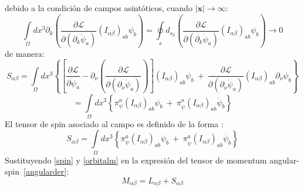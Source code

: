 \documentclass[a4paper,12pt]{article}
\begin{document}
debido a la condición de campos asintóticos, cuando $|\textbf{x}|\rightarrow\infty$:
\begin{equation}
\int\limits_{\Omega}dx^{3}\partial_k\left(\frac{\partial\mathscr{L} }{\partial(\partial_{k}\dot \psi_a)}(I_{\alpha\beta})_{ab}\psi_b\right)=\oint\limits_{s}d_{s_k}\left(\frac{\partial\mathscr{L} }{\partial(\partial_{k}\dot \psi_a)}(I_{\alpha\beta})_{ab}\psi_b\right)\rightarrow0 
\end{equation}
de manera:
$$
S_{\alpha\beta}=\int\limits_{\Omega}dx^{3}\left\{ \left[\frac{\partial \mathscr{L} }{\partial\dot \psi_a}-\partial_{\nu}\left(\frac{\partial\mathscr{L} }{\partial(\partial_{\nu}\dot \psi_a)}  \right) \right](I_{\alpha\beta})_{ab}\psi_{b}\ +\ \frac{\partial\mathscr{L} }{\partial(\partial_{\nu} \dot\psi_a)}(I_{\alpha\beta})_{ab}\partial_\nu\psi_{b}\right\}
$$
$$=\int\limits_{\Omega}dx^{3}\left\{\pi^{a}_{\psi}(I_{\alpha\beta})_{ab}\psi_{b}\ +\ \pi^{a}_{\dot\psi}(I_{\alpha\beta})_{ab}\dot\psi_b\right\} $$
El tensor de spin asociado al campo es definido de la forma \cite{greiner}:
\begin{equation}
S_{\alpha\beta}=\int\limits_{\Omega}dx^{3}\left\{\pi^{a}_{\psi}(I_{\alpha\beta})_{ab}\psi_{b}\ +\ \pi^{a}_{\dot\psi}(I_{\alpha\beta})_{ab}\dot\psi_b\right\}
\label{spin}  
\end{equation}
Sustituyendo \eqref{spin} y \eqref{orbitalm} en la expresión del tensor de momentum \mbox{angular-spin \eqref{angularder}:}
\begin{equation}
M_{\alpha\beta}=L_{\alpha\beta}+S_{\alpha\beta} 
\label{angular}
\end{equation}
\vspace{0,4cm}

\\
\end{document}

